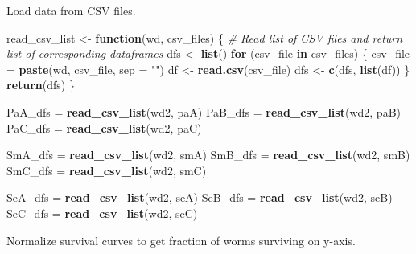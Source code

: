 \documentclass[]{article}
\newenvironment{Shaded}{\begin{snugshade}}{\end{snugshade}}
\newcommand{\KeywordTok}[1]{\textcolor[rgb]{0.13,0.29,0.53}{\textbf{#1}}}
\newcommand{\DataTypeTok}[1]{\textcolor[rgb]{0.13,0.29,0.53}{#1}}
\newcommand{\StringTok}[1]{\textcolor[rgb]{0.31,0.60,0.02}{#1}}
\newcommand{\CommentTok}[1]{\textcolor[rgb]{0.56,0.35,0.01}{\textit{#1}}}
\newcommand{\ControlFlowTok}[1]{\textcolor[rgb]{0.13,0.29,0.53}{\textbf{#1}}}
\newcommand{\NormalTok}[1]{#1}
\begin{document}
Load data from CSV files.

\begin{Shaded}
\begin{Highlighting}[]
\NormalTok{read_csv_list <-}\StringTok{ }\ControlFlowTok{function}\NormalTok{(wd, csv_files) \{}
  \CommentTok{# Read list of CSV files and return list of corresponding dataframes}
\NormalTok{  dfs <-}\StringTok{ }\KeywordTok{list}\NormalTok{()}
  \ControlFlowTok{for}\NormalTok{ (csv_file }\ControlFlowTok{in}\NormalTok{ csv_files) \{}
\NormalTok{    csv_file =}\StringTok{ }\KeywordTok{paste}\NormalTok{(wd, csv_file, }\DataTypeTok{sep =} \StringTok{""}\NormalTok{)}
\NormalTok{    df <-}\StringTok{ }\KeywordTok{read.csv}\NormalTok{(csv_file)}
\NormalTok{    dfs <-}\StringTok{ }\KeywordTok{c}\NormalTok{(dfs, }\KeywordTok{list}\NormalTok{(df))}
\NormalTok{  \}}
  \KeywordTok{return}\NormalTok{(dfs)}
\NormalTok{\}}

\NormalTok{PaA_dfs =}\StringTok{ }\KeywordTok{read_csv_list}\NormalTok{(wd2, paA)}
\NormalTok{PaB_dfs =}\StringTok{ }\KeywordTok{read_csv_list}\NormalTok{(wd2, paB)}
\NormalTok{PaC_dfs =}\StringTok{ }\KeywordTok{read_csv_list}\NormalTok{(wd2, paC)}

\NormalTok{SmA_dfs =}\StringTok{ }\KeywordTok{read_csv_list}\NormalTok{(wd2, smA)}
\NormalTok{SmB_dfs =}\StringTok{ }\KeywordTok{read_csv_list}\NormalTok{(wd2, smB)}
\NormalTok{SmC_dfs =}\StringTok{ }\KeywordTok{read_csv_list}\NormalTok{(wd2, smC)}

\NormalTok{SeA_dfs =}\StringTok{ }\KeywordTok{read_csv_list}\NormalTok{(wd2, seA)}
\NormalTok{SeB_dfs =}\StringTok{ }\KeywordTok{read_csv_list}\NormalTok{(wd2, seB)}
\NormalTok{SeC_dfs =}\StringTok{ }\KeywordTok{read_csv_list}\NormalTok{(wd2, seC)}
\end{Highlighting}
\end{Shaded}

Normalize survival curves to get fraction of worms surviving on y-axis.
\end{document}
